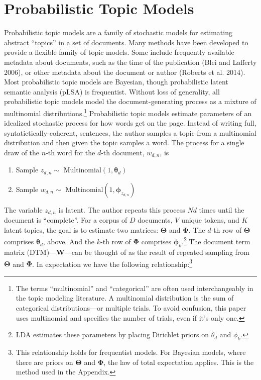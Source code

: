 \documentclass[conference,final,]{IEEEtran}
\providecommand{\tightlist}{%
  \setlength{\itemsep}{0pt}\setlength{\parskip}{0pt}}
\begin{document}
\hypertarget{probabilistic-topic-models}{%
\section{Probabilistic Topic Models}\label{probabilistic-topic-models}}

Probabilistic topic models are a family of stochastic models for
estimating abstract ``topics'' in a set of documents. Many methods have
been developed to provide a flexible family of topic models. Some
include frequently available metadata about documents, such as the time
of the publication (Blei and Lafferty 2006), or other metadata about the
document or author (Roberts et al. 2014). Most probabilistic topic
models are Bayesian, though probabilistic latent semantic analysis
(pLSA) is frequentist. Without loss of generality, all probabilistic
topic models model the document-generating process as a mixture of
multinomial distributions.\footnote{The terms ``multinomial'' and
  ``categorical'' are often used interchangeably in the topic modeling
  literature. A multinomial distribution is the sum of categorical
  distributions---or multiple trials. To avoid confusion, this paper
  uses multinomial and specifies the number of trials, even if it's only
  one.} Probabilistic topic models estimate parameters of an idealized
stochastic process for how words get on the page. Instead of writing
full, syntatictically-coherent, sentences, the author samples a topic
from a multinomial distribution and then given the topic samples a word.
The process for a single draw of the \(n\)-th word for the \(d\)-th
document, \(w_{d,n}\), is

\begin{enumerate}
\def\labelenumi{\arabic{enumi}.}
\tightlist
\item
  Sample \(z_{d,n}\sim\) \(\text{Multinomial}(1,\boldsymbol\theta_d)\)
\item
  Sample \(w_{d,n}\sim\)
  \(\text{Multinomial}(1,\boldsymbol\phi_{z_{d,n}})\)
\end{enumerate}

The variable \(z_{d,n}\) is latent. The author repeats this process
\(Nd\) times until the document is ``complete''. For a corpus of \(D\)
documents, \(V\) unique tokens, and \(K\) latent topics, the goal is to
estimate two matrices: \(\boldsymbol\Theta\) and \(\boldsymbol\Phi\).
The \(d\)-th row of \(\boldsymbol\Theta\) comprises
\(\boldsymbol\theta_d\), above. And the \(k\)-th row of
\(\boldsymbol\Phi\) comprises \(\boldsymbol\phi_k\).\footnote{LDA
  estimates these parameters by placing Dirichlet priors on \(\theta_d\)
  and \(\phi_k\).} The document term matrix (DTM)---\(\mathbf{W}\)---can
be thought of as the result of repeated sampling from
\(\boldsymbol\Theta\) and \(\boldsymbol\Phi\). In expectation we have
the following relationship:\footnote{This relationship holds for
  frequentist models. For Bayesian models, where there are priors on
  \(\boldsymbol\Theta\) and \(\boldsymbol\Phi\), the law of total
  expectation applies. This is the method used in the Appendix.}
\end{document}

